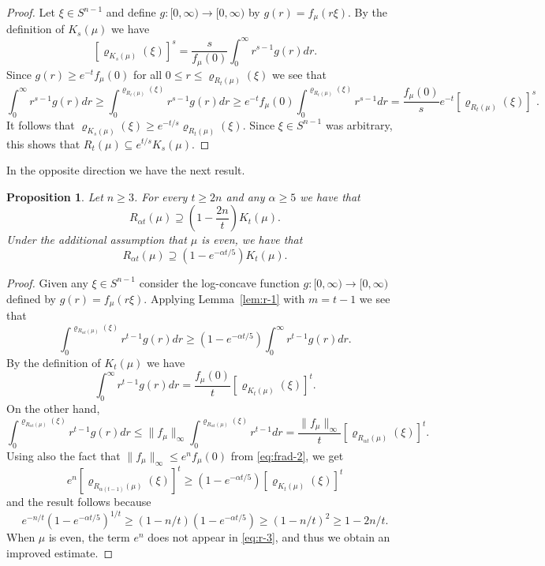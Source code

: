 \documentclass[11pt,leqno]{article}
\newtheorem{proposition}[theorem]{Proposition}
\theoremstyle{definition}
\theoremstyle{remark}
\numberwithin{equation}{section}
\newcommand{\ls}{\leqslant}
\newcommand{\gr}{\geqslant}
\newcommand{\1}{\textbf{1}}
\begin{document}
\begin{proof}Let $\xi\in S^{n-1}$ and define $g:[0,\infty )\to [0,\infty )$ by
$g(r)=f_{\mu }(r\xi )$. By the definition of $K_s(\mu )$ we have
$$[\varrho_{K_s(\mu )}(\xi )]^s=\frac{s}{f_{\mu }(0)}\int_0^{\infty }r^{s-1}g(r)dr.$$
Since $g(r)\gr e^{-t}f_{\mu}(0)$ for all $0\ls r\ls\varrho_{R_t(\mu)}(\xi)$ we see that
$$\int_0^{\infty }r^{s-1}g(r)dr\gr \int_0^{\varrho_{R_t(\mu)}(\xi)}r^{s-1}g(r)dr
\gr e^{-t}f_{\mu}(0)\int_0^{\varrho_{R_t(\mu)}(\xi)}r^{s-1}dr=\frac{f_{\mu}(0)}{s}e^{-t}[\varrho_{R_t(\mu )}(\xi )]^s.$$
It follows that $\varrho_{K_s(\mu )}(\xi )\gr e^{-t/s}\varrho_{R_t(\mu )}(\xi )$. Since $\xi\in S^{n-1}$
was arbitrary, this shows that $R_t(\mu )\subseteq e^{t/s}K_s(\mu )$.
\end{proof}

In the opposite direction we have the next result.

\begin{proposition}\label{prop:r-4}Let $n\gr 3$. For every $t\gr 2n$ and any $\alpha\gr 5$ we have that
$$R_{\alpha t}(\mu )\supseteq \left(1-\frac{2n}{t}\right)K_t(\mu ).$$
Under the additional assumption that $\mu$ is even, we have that
$$R_{\alpha t}(\mu )\supseteq \left(1-e^{-\alpha t/5}\right)K_t(\mu ).$$
\end{proposition}

\begin{proof}Given any $\xi\in S^{n-1}$ consider the log-concave function $g:[0,\infty )\to [0,\infty )$ defined by
$g(r)=f_{\mu }(r\xi )$. Applying Lemma~\ref{lem:r-1} with $m=t-1$ we see that
$$\int_0^{\varrho_{R_{\alpha t}(\mu )}(\xi )}r^{t-1}g(r)dr\gr (1-e^{-\alpha t/5})\int_0^{\infty }r^{t-1}g(r)dr.$$
By the definition of $K_t(\mu )$ we have
$$\int_0^{\infty }r^{t-1}g(r)dr=\frac{f_{\mu }(0)}{t}[\varrho_{K_t(\mu )}(\xi )]^t.$$
On the other hand,
$$\int_0^{\varrho_{R_{\alpha t}(\mu )}(\xi )}r^{t-1}g(r)dr\ls \|f_{\mu}\|_{\infty }\int_0^{\varrho_{R_{\alpha t}(\mu )}(\xi )}r^{t-1}dr
=\frac{\|f_{\mu}\|_{\infty }}{t}[\varrho_{R_{\alpha t}(\mu )}(\xi )]^t.$$
Using also the fact that $\|f_{\mu}\|_{\infty }\ls e^nf_{\mu }(0)$ from \eqref{eq:frad-2}, we get
\begin{equation}\label{eq:r-3}e^n[\varrho_{R_{\alpha (t-1)}(\mu )}(\xi )]^t
\gr (1-e^{-\alpha t/5})[\varrho_{K_t(\mu )}(\xi )]^t\end{equation}
and the result follows because
$$e^{-n/t}(1-e^{-\alpha t/5})^{1/t}\gr (1-n/t)(1-e^{-\alpha t/5})\gr
(1-n/t)^2\gr 1-2n/t.$$ When $\mu$ is even, the term $e^n$ does not appear
in \eqref{eq:r-3}, and thus we obtain an improved estimate. \end{proof}
\end{document}
